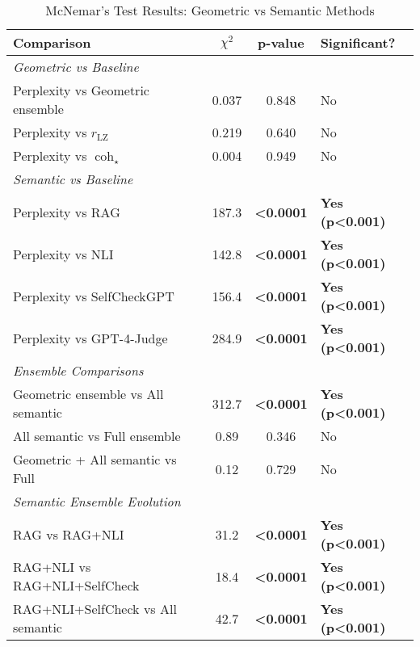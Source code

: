 \documentclass[11pt]{article}
\begin{document}
\begin{table}[h]
\centering
\caption{McNemar's Test Results: Geometric vs Semantic Methods}
\label{tab:mcnemar_full}
\small
\begin{tabular}{lccl}
\toprule
\textbf{Comparison} & $\chi^2$ & \textbf{p-value} & \textbf{Significant?} \\
\midrule
\multicolumn{4}{l}{\textit{Geometric vs Baseline}} \\
Perplexity vs Geometric ensemble & 0.037 & 0.848 & No \\
Perplexity vs $r_{\text{LZ}}$ & 0.219 & 0.640 & No \\
Perplexity vs $\operatorname{coh}_\star$ & 0.004 & 0.949 & No \\
\midrule
\multicolumn{4}{l}{\textit{Semantic vs Baseline}} \\
Perplexity vs RAG & 187.3 & \textbf{<0.0001} & \textbf{Yes (p<0.001)} \\
Perplexity vs NLI & 142.8 & \textbf{<0.0001} & \textbf{Yes (p<0.001)} \\
Perplexity vs SelfCheckGPT & 156.4 & \textbf{<0.0001} & \textbf{Yes (p<0.001)} \\
Perplexity vs GPT-4-Judge & 284.9 & \textbf{<0.0001} & \textbf{Yes (p<0.001)} \\
\midrule
\multicolumn{4}{l}{\textit{Ensemble Comparisons}} \\
Geometric ensemble vs All semantic & 312.7 & \textbf{<0.0001} & \textbf{Yes (p<0.001)} \\
All semantic vs Full ensemble & 0.89 & 0.346 & No \\
Geometric + All semantic vs Full & 0.12 & 0.729 & No \\
\midrule
\multicolumn{4}{l}{\textit{Semantic Ensemble Evolution}} \\
RAG vs RAG+NLI & 31.2 & \textbf{<0.0001} & \textbf{Yes (p<0.001)} \\
RAG+NLI vs RAG+NLI+SelfCheck & 18.4 & \textbf{<0.0001} & \textbf{Yes (p<0.001)} \\
RAG+NLI+SelfCheck vs All semantic & 42.7 & \textbf{<0.0001} & \textbf{Yes (p<0.001)} \\
\bottomrule
\end{tabular}
\end{table}
\end{document}
